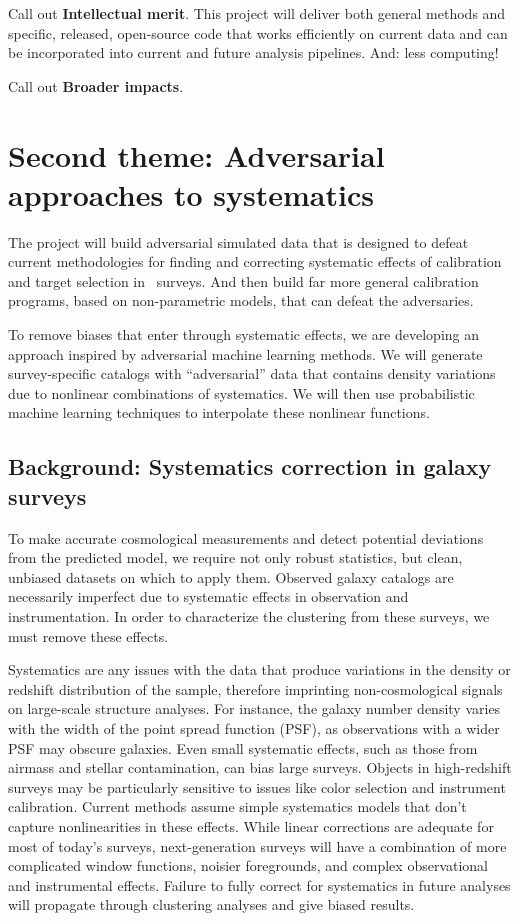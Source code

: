\documentclass[12pt, fullpage, letterpaper]{article}
\begin{document}
Call out \textbf{Intellectual merit}.
This project will deliver both general methods and specific, released,
open-source code that works efficiently on current data and can be
incorporated into current and future analysis pipelines. And: less computing!

Call out \textbf{Broader impacts}.



\section{Second theme: Adversarial approaches to systematics}

The project will build adversarial simulated data that is
designed to defeat current methodologies for finding and correcting
systematic effects of calibration and target selection in \LSS\ 
surveys. And then build far more general calibration
programs, based on non-parametric models, that can defeat the
adversaries.

To remove biases that enter through systematic effects, we are developing an approach inspired by adversarial machine learning methods. 
We will generate survey-specific catalogs with ``adversarial'' data that contains density variations due to nonlinear combinations of systematics.
We will then use probabilistic machine learning techniques to interpolate these nonlinear functions.

\subsection{Background: Systematics correction in galaxy surveys}

To make accurate cosmological measurements and detect potential deviations from the predicted model, we require not only robust statistics, but clean, unbiased datasets on which to apply them.
Observed galaxy catalogs are necessarily imperfect due to systematic effects in observation and instrumentation. 
In order to characterize the clustering from these surveys, we must remove these effects.

Systematics are any issues with the data that produce variations in the density or redshift distribution of the sample, therefore imprinting non-cosmological signals on large-scale structure analyses.
For instance, the galaxy number density varies with the width of the point spread function (PSF), as observations with a wider PSF may obscure galaxies.
Even small systematic effects, such as those from airmass and stellar contamination, can bias large surveys. 
Objects in high-redshift surveys may be particularly sensitive to issues like color selection and instrument calibration.
Current methods assume simple systematics models that don't capture nonlinearities in these effects.
While linear corrections are adequate for most of today's surveys, next-generation surveys will have a combination of more complicated window functions, noisier foregrounds, and complex observational and instrumental effects.
Failure to fully correct for systematics in future analyses will propagate through clustering analyses and give biased results.
\end{document}
